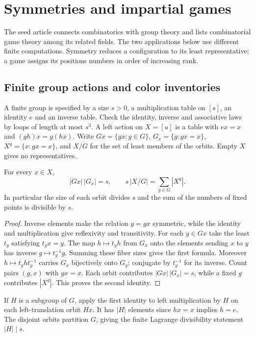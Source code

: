\section{Symmetries and impartial games}
\label{sec:actions-games}
The seed article connects combinatorics with group theory and lists
combinatorial game theory among its related fields.
The two applications below use different finite computations. Symmetry
reduces a configuration to its least representative; a game assigns its
positions numbers in order of increasing rank.

\subsection{Finite group actions and color inventories}
A finite group is specified by a size $s>0$, a multiplication table
on $[s]$, an identity $e$ and an inverse table. Check the identity,
inverse and associative laws by loops of length at most $s^3$.
A left action on $X=[u]$ is a table with
$ex=x$ and $(gh)x=g(hx)$.
Write $Gx=\{gx:g\in G\}$, $G_x=\{g:gx=x\}$,
$X^g=\{x:gx=x\}$, and $X/G$ for the set of least members of the
orbits. Empty $X$ gives no representatives.
\begin{theorem}\label{result63}
For every $x\in X$,
\[
 |Gx|\,|G_x|=s,\qquad
 s\,|X/G|=\sum_{g\in G}|X^g|.
\]
In particular the size of each orbit divides $s$ and the sum of the
numbers of fixed points is divisible by $s$.
\end{theorem}
\begin{proof}
Inverse elements make the relation $y=gx$ symmetric, while the identity
and multiplication give reflexivity and transitivity. For each $y\in Gx$
take the least $t_y$ satisfying $t_yx=y$. The map
$h\mapsto t_yh$ from $G_x$ onto the elements sending $x$ to $y$ has
inverse $g\mapsto t_y^{-1}g$. Summing these fiber sizes gives the first
formula. Moreover $h\mapsto t_yht_y^{-1}$ carries $G_x$ bijectively onto
$G_y$; conjugate by $t_y^{-1}$ for its inverse. Count pairs $(g,x)$
with $gx=x$. Each orbit contributes $|Gx|\,|G_x|=s$, while a fixed
$g$ contributes $|X^g|$. This proves the second identity.
\end{proof}
If $H$ is a subgroup of $G$, apply the first identity to left
multiplication by $H$ on each left-translation orbit $Hx$. It has
$|H|$ elements since $hx=x$ implies $h=e$. The disjoint orbits partition
$G$, giving the finite Lagrange divisibility statement $|H|\mid s$.

